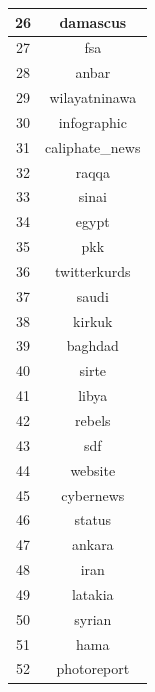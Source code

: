 \documentclass[conference]{IEEEtran}
\begin{document}
\begin{table}[ht]
\begin{tabular} { | c | c | }
            \hline
            26   & damascus        \\
            \hline
            27   & fsa             \\
            \hline
            28   & anbar           \\
            \hline
            29   & wilayatninawa   \\
            \hline
            30   & infographic     \\
            \hline
            31   & caliphate\_news \\
            \hline
            32   & raqqa           \\
            \hline
            33   & sinai           \\
            \hline
            34   & egypt           \\
            \hline
            35   & pkk             \\
            \hline
            36   & twitterkurds    \\
            \hline
            37   & saudi           \\
            \hline
            38   & kirkuk          \\
            \hline
            39   & baghdad         \\
            \hline
            40   & sirte           \\
            \hline
            41   & libya           \\
            \hline
            42   & rebels          \\
            \hline
            43   & sdf             \\
            \hline
            44   & website         \\
            \hline
            45   & cybernews       \\
            \hline
            46   & status          \\
            \hline
            47   & ankara          \\
            \hline
            48   & iran            \\
            \hline
            49   & latakia         \\
            \hline
            50   & syrian          \\
            \hline
            51   & hama            \\
            \hline
            52   & photoreport     \\

\end{tabular}
\end{table}
\end{document}
